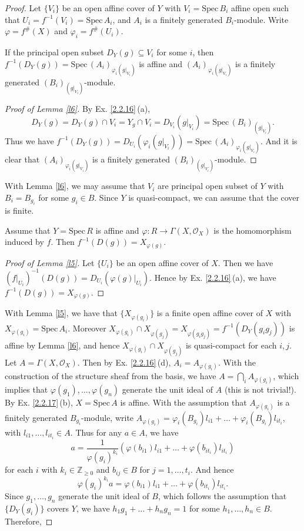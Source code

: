\begin{proof}
	Let $\{V_i\}$ be an open affine cover of $Y$ with $V_i=\mathrm{Spec}\,B_i$ affine open such that $U_i=f^{-1}(V_i)=\mathrm{Spec}\,A_i$, and $A_i$ is a finitely generated $B_i$-module. Write $\varphi=f^\#(X)$ and $\varphi_i=f^\#(U_i)$.
	\begin{lm}
		\label{l6}
		If the principal open subset $D_Y(g)\subseteq V_i$ for some $i$, then $f^{-1}(D_Y(g))=\mathrm{Spec}\,(A_i)_{\varphi_i(g|_{V_i})}$ is affine and $(A_i)_{\varphi_{i}(g|_{V_i})}$ is a finitely generated $(B_i)_{(g|_{V_i})}$-module.
	\end{lm}
	\begin{proof}[Proof of Lemma \ref*{l6}]
		By Ex. \ref{2.2.16}\,(a), $$D_Y(g)=D_Y(g)\cap V_i=Y_g\cap V_i=D_{V_i}(g|_{V_i})=\mathrm{Spec}\,(B_i)_{(g|_{V_i})}.$$ Thus we have $f^{-1}(D_Y(g))=D_{U_i}(\varphi_i(g|_{V_i}))=\mathrm{Spec}\,(A_i)_{\varphi_i(g|_{V_i})}.$ And it is clear that $(A_i)_{\varphi_{i}(g|_{V_i})}$ is a finitely generated $(B_i)_{(g|_{V_i})}$-module.
	\end{proof}
	With Lemma \ref{l6}, we may assume that $V_i$ are principal open subset of $Y$ with $B_i=B_{g_i}$ for some $g_i\in B$. Since $Y$ is quasi-compact, we can assume that the cover is finite.
	\begin{lm}
		\label{l5}
		Assume that $Y=\mathrm{Spec}\,R$ is affine and $\varphi:R\to\Gamma(X,\mathcal{O}_X)$ is the homomorphism induced by $f$. Then $f^{-1}(D(g))=X_{\varphi(g)}$.
	\end{lm}
	\begin{proof}[Proof of Lemma \ref*{l5}]
		Let $\{U_i\}$ be an open affine cover of $X$. Then we have $(f|_{U_i})^{-1}(D(g))=D_{U_i}(\varphi(g)|_{U_i})$. Hence by Ex. \ref{2.2.16}\,(a), we have $f^{-1}(D(g))=X_{\varphi(g)}$.
	\end{proof}
	With Lemma \ref{l5}, we have that $\{X_{\varphi(g_i)}\}$ is a finite open affine cover of $X$ with $X_{\varphi(g_i)}=\mathrm{Spec}\,A_i$. Moreover $X_{\varphi(g_i)}\cap X_{\varphi(g_j)}=X_{\varphi(g_ig_j)}=f^{-1}(D_Y(g_ig_j))$ is affine by Lemma \ref{l6}, and hence $X_{\varphi(g_i)}\cap X_{\varphi(g_j)}$ is quasi-compact for each $i,j$. Let $A=\Gamma(X,\mathcal{O}_X)$. Then by Ex. \ref{2.2.16}\,(d), $A_i=A_{\varphi(g_i)}$. With the construction of the structure sheaf from the basis, we have $A=\bigcap_iA_{\varphi(g_i)}$, which implies that $\varphi(g_1),\dots,\varphi(g_n)$ generate the unit ideal of $A$ (this is not trivial!). By Ex. \ref{2.2.17}\,(b), $X=\mathrm{Spec}\,A$ is affine. With the assumption that $A_{\varphi(g_i)}$ is a finitely generated $B_{g_i}$-module, write $A_{\varphi(g_i)}=\varphi_i(B_{g_i})l_{i1}+\dots+\varphi_i(B_{g_i})l_{it_i}$, with $l_{i1},\dots,l_{it_i}\in A$. Thus for any $a\in A$, we have $$a=\frac{1}{\varphi(g_i)^{k_i}}(\varphi(b_{i1})l_{i1}+\dots+\varphi(b_{it_i})l_{it_i})$$for each $i$ with $k_i\in\mathbb{Z}_{\geq0}$ and $b_{ij}\in B$ for $j=1,\dots,t_i$. And hence$$\varphi(g_i)^{k_i}a=\varphi(b_{i1})l_{i1}+\dots+\varphi(b_{it_i})l_{it_i}.$$Since $g_1,\dots,g_n$ generate the unit ideal of $B$, which follows the assumption that $\{D_Y(g_i)\}$ covers $Y$, we have $h_1g_1+\dots+h_ng_n=1$ for some $h_1,\dots,h_n\in B$. Therefore,

\end{proof}

